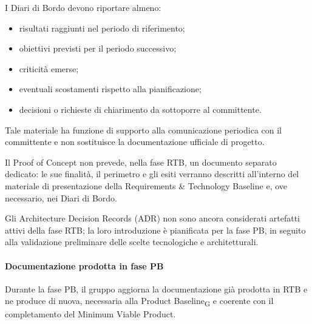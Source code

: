I Diari di Bordo devono riportare almeno:
\begin{itemize}
    \item risultati raggiunti nel periodo di riferimento;
    \item obiettivi previsti per il periodo successivo;
    \item criticità emerse;
    \item eventuali scostamenti rispetto alla pianificazione;
    \item decisioni o richieste di chiarimento da sottoporre al committente.
\end{itemize}

Tale materiale ha funzione di supporto alla comunicazione periodica con il
committente e non sostituisce la documentazione ufficiale di progetto.

Il Proof of Concept non prevede, nella fase RTB, un documento separato dedicato:
le sue finalità, il perimetro e gli esiti verranno descritti all'interno del materiale
di presentazione della Requirements \& Technology Baseline e, ove necessario, nei Diari
di Bordo.

Gli Architecture Decision Records (ADR) non sono ancora considerati
artefatti attivi della fase RTB; la loro introduzione è pianificata per la fase PB,
in seguito alla validazione preliminare delle scelte tecnologiche e architetturali.


\paragraph{Documentazione prodotta in fase PB}

Durante la fase PB, il gruppo aggiorna la documentazione già prodotta in RTB e ne
produce di nuova, necessaria alla Product Baseline\textsubscript{G} e coerente con il
completamento del Minimum Viable Product.

\bigskip

